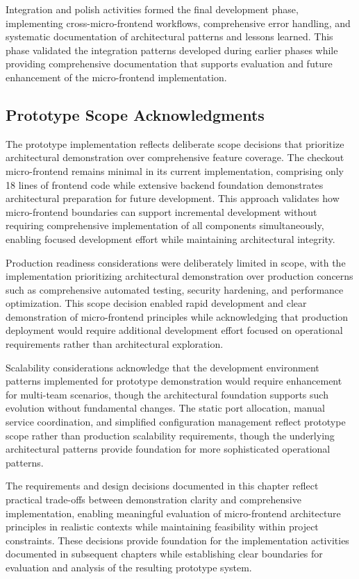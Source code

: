 \documentclass[12pt,a4paper]{report}
\begin{document}
Integration and polish activities formed the final development phase, implementing cross-micro-frontend workflows, comprehensive error handling, and systematic documentation of architectural patterns and lessons learned. This phase validated the integration patterns developed during earlier phases while providing comprehensive documentation that supports evaluation and future enhancement of the micro-frontend implementation.

\subsection{Prototype Scope Acknowledgments}

The prototype implementation reflects deliberate scope decisions that prioritize architectural demonstration over comprehensive feature coverage. The checkout micro-frontend remains minimal in its current implementation, comprising only 18 lines of frontend code while extensive backend foundation demonstrates architectural preparation for future development. This approach validates how micro-frontend boundaries can support incremental development without requiring comprehensive implementation of all components simultaneously, enabling focused development effort while maintaining architectural integrity.

Production readiness considerations were deliberately limited in scope, with the implementation prioritizing architectural demonstration over production concerns such as comprehensive automated testing, security hardening, and performance optimization. This scope decision enabled rapid development and clear demonstration of micro-frontend principles while acknowledging that production deployment would require additional development effort focused on operational requirements rather than architectural exploration.

Scalability considerations acknowledge that the development environment patterns implemented for prototype demonstration would require enhancement for multi-team scenarios, though the architectural foundation supports such evolution without fundamental changes. The static port allocation, manual service coordination, and simplified configuration management reflect prototype scope rather than production scalability requirements, though the underlying architectural patterns provide foundation for more sophisticated operational patterns.

The requirements and design decisions documented in this chapter reflect practical trade-offs between demonstration clarity and comprehensive implementation, enabling meaningful evaluation of micro-frontend architecture principles in realistic contexts while maintaining feasibility within project constraints. These decisions provide foundation for the implementation activities documented in subsequent chapters while establishing clear boundaries for evaluation and analysis of the resulting prototype system.
\end{document}
